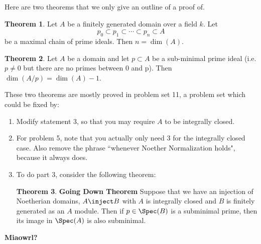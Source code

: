 \documentclass[12 pt]{article}
\theoremstyle{definition}
\newtheorem{theorem}{Theorem}[section]
\begin{document}
Here are two theorems that we only give an outline of a proof of.

\begin{theorem}
Let $A$ be a finitely generated domain over a field $k$. Let
\[p_0 \subset p_1 \subset \cdots  \subset p_n \subset A\]
be a maximal chain of prime ideals. Then $n=\dim(A)$.
\end{theorem}


\begin{theorem} Let $A$ be a domain and let $p \subset A$ be a sub-minimal prime ideal (i.e. $p \neq 0$ but there are no primes between 0 and p). Then $\dim(A/p)=\dim(A)-1$.
\end{theorem}

These two theorems are mostly proved in problem set 11, a problem set which could be fixed by:
\begin{enumerate}
\item Modify statement 3, so that you may require $A$ to be integrally closed.
\item For problem 5, note that you actually only need 3 for the integrally closed case. Also remove the phrase ``whenever Noether Normalization holds", because it always does.
\item To do part 3, consider the following theorem:

\begin{theorem} \textbf{Going Down Theorem}
Suppose that we have an injection of Noetherian domains, $A \inject B$ with $A$ is integrally closed and $B$ is finitely generated as an $A$ module. Then if $p \in \Spec(B)$ is a subminimal prime, then its image in $\Spec(A)$ is also subminimal.
\end{theorem}
\end{enumerate}






\textcolor[rgb]{1.00,0.00,0.00}{\textbf{Miaowrl?}}










\newpage

\end{document}
